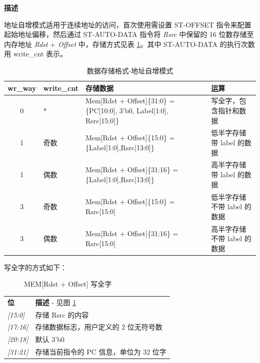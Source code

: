 \documentclass[main\_\_CN.tex]{subfiles}
\begin{document}
\textbf{描述}

地址自增模式适用于连续地址的访问，首次使用需设置 ST-OFFSET 指令来配置起始地址偏移，然后通过 ST-AUTO-DATA 指令将 \textit{Rsrc} 中保留的 16 位数存储至内存地址 \textit{Rdst} + \textit{Offset} 中，存储方式见表 \ref{tab:data_format-with-write_way-auto}。其中 ST-AUTO-DATA 的执行次数用 write\_cnt 表示。 \\


\begin{table}[H]
    \centering
    \begin{tabular}{ c l l l }
    \textbf{wr\_way}  & \textbf{write\_cnt} & \textbf{存储数据} & \textbf{运算}  \\ \hline
    0 &*&Mem[Rdst + Offset]\{31:0\} =\{PC[10:0], 3'b0, Label[1:0], Rsrc[15:0]\}  & 写全字，包含指针和数据 \\
    1 & 奇数 & Mem[Rdst + Offset]\{15:0\}  = \{Label[1:0],Rsrc[13:0]\}& 低半字存储带 label 的数据\\
    1 & 偶数 & Mem[Rdst + Offset]\{31:16\} = \{Label[1:0],Rsrc[13:0]\}& 高半字存储带 label 的数据\\
    3 & 奇数 & Mem[Rdst + Offset]\{15:0\}  = Rsrc[15:0]& 低半字存储不带 label 的数据  \\
    3 & 偶数 & Mem[Rdst + Offset]\{31:16\} = Rsrc[15:0]& 高半字存储不带 label 的数据  \\
    \end{tabular}
    \caption{数据存储格式-地址自增模式}
    \label{tab:data_format-with-write_way-auto}
\end{table}

写全字的方式如下：

%
%
%
%
\begin{figure}[!ht ]
    \centering
    \caption{MEM[Rdst + Offset] 写全字}
    \label{figure:RTCMEM}
\end{figure}

\vspace{-2em}
\begin{tabular}{ l l }
\textbf{位} & \textbf{描述} - 见图 \ref{figure:RTCMEM} \\
\textit{[15:0] } & 存储 Rsrc 的内容\\
\textit{[17:16] } & 存储数据标志，用户定义的 2 位无符号数\\
\textit{[20:18]} & 默认 3'b0 \\
\textit{[31:21]} & 存储当前指令的 PC 信息，单位为 32 位字\\
\end{tabular}
\end{document}
